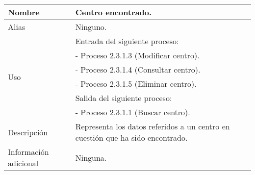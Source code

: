 \begin{center}
  \begin{tabular}{| l | p{9cm} |}
    \hline
    Nombre & \textbf{Centro encontrado}.\\
    \hline
    Alias & Ninguno.\\
    \hline
    \multirow{6}{*}{Uso} & Entrada del siguiente proceso:\\
                         & - Proceso 2.3.1.3 (Modificar centro).\\
                         & - Proceso 2.3.1.4 (Consultar centro).\\
                         & - Proceso 2.3.1.5 (Eliminar centro).\\
                         & Salida del siguiente proceso:\\
                         & - Proceso 2.3.1.1 (Buscar centro).\\
    \hline
    Descripción & Representa los datos referidos a un centro en cuestión que ha
                  sido encontrado.\\
    \hline
    Información adicional & Ninguna.\\
    \hline
  \end{tabular}
\end{center}
